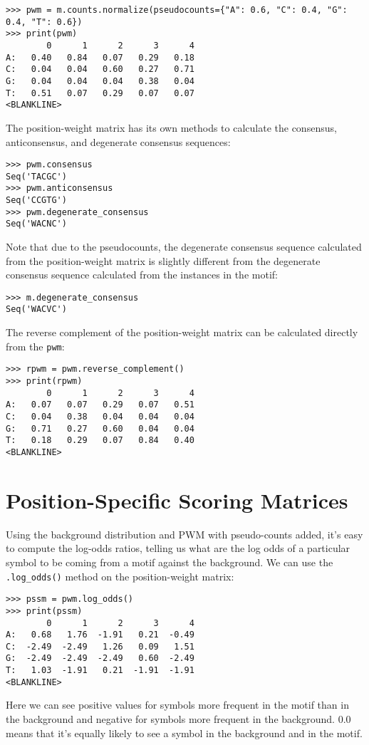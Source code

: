 \begin{verbatim}
>>> pwm = m.counts.normalize(pseudocounts={"A": 0.6, "C": 0.4, "G": 0.4, "T": 0.6})
>>> print(pwm)
        0      1      2      3      4
A:   0.40   0.84   0.07   0.29   0.18
C:   0.04   0.04   0.60   0.27   0.71
G:   0.04   0.04   0.04   0.38   0.04
T:   0.51   0.07   0.29   0.07   0.07
<BLANKLINE>
\end{verbatim}
The position-weight matrix has its own methods to calculate the
consensus, anticonsensus, and degenerate consensus sequences:

\begin{verbatim}
>>> pwm.consensus
Seq('TACGC')
>>> pwm.anticonsensus
Seq('CCGTG')
>>> pwm.degenerate_consensus
Seq('WACNC')
\end{verbatim}
Note that due to the pseudocounts, the degenerate consensus sequence
calculated from the position-weight matrix is slightly different
from the degenerate consensus sequence calculated from the instances
in the motif:

\begin{verbatim}
>>> m.degenerate_consensus
Seq('WACVC')
\end{verbatim}
The reverse complement of the position-weight matrix can be calculated directly from the \verb+pwm+:

\begin{verbatim}
>>> rpwm = pwm.reverse_complement()
>>> print(rpwm)
        0      1      2      3      4
A:   0.07   0.07   0.29   0.07   0.51
C:   0.04   0.38   0.04   0.04   0.04
G:   0.71   0.27   0.60   0.04   0.04
T:   0.18   0.29   0.07   0.84   0.40
<BLANKLINE>
\end{verbatim}

\section{Position-Specific Scoring Matrices}

Using the background distribution and PWM with pseudo-counts added,
it's easy to compute the log-odds ratios, telling us what are the log
odds of a particular symbol to be coming from a motif against the
background. We can use the \verb|.log_odds()| method on the position-weight
matrix:

\begin{verbatim}
>>> pssm = pwm.log_odds()
>>> print(pssm)
        0      1      2      3      4
A:   0.68   1.76  -1.91   0.21  -0.49
C:  -2.49  -2.49   1.26   0.09   1.51
G:  -2.49  -2.49  -2.49   0.60  -2.49
T:   1.03  -1.91   0.21  -1.91  -1.91
<BLANKLINE>
\end{verbatim}
Here we can see positive values for symbols more frequent in the motif
than in the background and negative for symbols more frequent in the
background. $0.0$ means that it's equally likely to see a symbol in the
background and in the motif.

